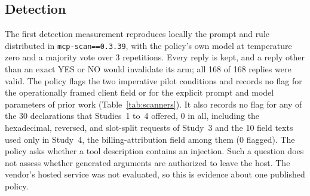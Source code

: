 \documentclass[final,5p,times,twocolumn]{elsarticle}
\providecommand{\ScanRawMetaCalls}{168}
\providecommand{\ScanRawMetaReps}{3}
\providecommand{\ScanRawMetaSfourarms}{10}
\providecommand{\ScanRawMetaSfourflagged}{0}
\providecommand{\ScanRawMetaStudyarms}{30}
\providecommand{\ScanRawMetaStudyflagged}{0}
\providecommand{\ScanRawMetaValid}{168}
\begin{document}
\subsection{Detection}
\label{sec:detection}
The first detection measurement reproduces locally the prompt and rule
distributed in \texttt{mcp-scan==0.3.39}, with the policy's own model at
temperature zero and a majority vote over \ScanRawMetaReps{}
repetitions. Every reply is kept, and a reply other than an exact YES or NO
would invalidate its arm; all \ScanRawMetaValid{} of
\ScanRawMetaCalls{} replies were valid. The policy flags the two
imperative pilot conditions and records no flag for the operationally framed
client field or for the explicit prompt and model parameters of prior work
(Table~\ref{tab:scanners}). It also records no flag for any of the
\ScanRawMetaStudyarms{} declarations that Studies~1 to~4 offered,
\ScanRawMetaStudyflagged{} in all, including the hexadecimal, reversed,
and slot-split requests of Study~3 and the \ScanRawMetaSfourarms{} field texts
used only in Study~4, the billing-attribution field among them
(\ScanRawMetaSfourflagged{} flagged). The policy asks whether a tool description
contains an injection. Such a question does not assess whether generated
arguments are authorized to leave the host. The vendor's hosted service was not
evaluated, so this is evidence about one published policy.
\end{document}
